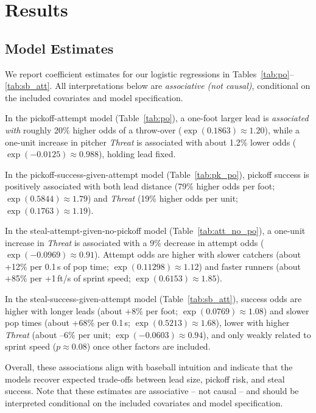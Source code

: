 \documentclass[12pt,letterpaper]{article}
\begin{document}
\section{Results}

\subsection{Model Estimates} \label{sec:model-estimates}

We report coefficient estimates for our logistic regressions in Tables~\ref{tab:po}--\ref{tab:sb_att}. All interpretations below are \emph{associative (not causal)}, conditional on the included covariates and model specification.

In the pickoff-attempt model (Table~\ref{tab:po}), a one-foot larger lead is \emph{associated with} roughly 20\% higher odds of a throw-over ($\exp(0.1863)\!\approx\!1.20$), while a one-unit increase in pitcher \emph{Threat} is associated with about 1.2\% lower odds ($\exp(-0.0125)\!\approx\!0.988$), holding lead fixed.

In the pickoff-success-given-attempt model (Table~\ref{tab:pk_po}), pickoff success is positively associated with both lead distance (79\% higher odds per foot; $\exp(0.5844)\!\approx\!1.79$) and \emph{Threat} (19\% higher odds per unit; $\exp(0.1763)\!\approx\!1.19$).

In the steal-attempt-given-no-pickoff model (Table~\ref{tab:att_no_po}), a one-unit increase in \emph{Threat} is associated with a 9\% decrease in attempt odds ($\exp(-0.0969)\!\approx\!0.91$). Attempt odds are higher with slower catchers (about +12\% per 0.1\,s of pop time; $\exp(0.11298)\!\approx\!1.12$) and faster runners (about +85\% per +1\,ft/s of sprint speed; $\exp(0.6153)\!\approx\!1.85$).

In the steal-success-given-attempt model (Table~\ref{tab:sb_att}), success odds are higher with longer leads (about +8\% per foot; $\exp(0.0769)\!\approx\!1.08$) and slower pop times (about +68\% per 0.1\,s; $\exp(0.5213)\!\approx\!1.68$), lower with higher \emph{Threat} (about --6\% per unit; $\exp(-0.0603)\!\approx\!0.94$), and only weakly related to sprint speed ($p\approx 0.08$) once other factors are included.

Overall, these associations align with baseball intuition and indicate that the models recover expected trade-offs between lead size, pickoff risk, and steal success. Note that these estimates are associative -- not causal -- and should be interpreted conditional on the included covariates and model specification.
\end{document}
